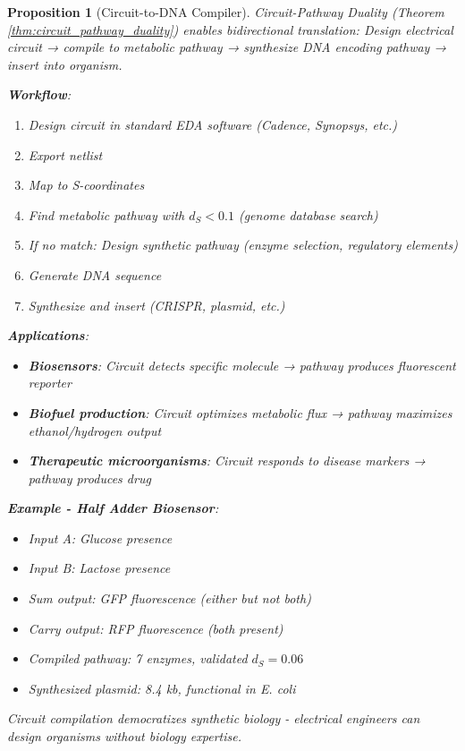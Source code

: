 \documentclass[11pt,a4paper]{article}
\newtheorem{proposition}[theorem]{Proposition}
\theoremstyle{definition}
\theoremstyle{remark}
\begin{document}
\begin{proposition}[Circuit-to-DNA Compiler]
Circuit-Pathway Duality (Theorem \ref{thm:circuit_pathway_duality}) enables bidirectional translation: Design electrical circuit → compile to metabolic pathway → synthesize DNA encoding pathway → insert into organism.

\textbf{Workflow}:
\begin{enumerate}
\item Design circuit in standard EDA software (Cadence, Synopsys, etc.)
\item Export netlist
\item Map to S-coordinates
\item Find metabolic pathway with $d_S < 0.1$ (genome database search)
\item If no match: Design synthetic pathway (enzyme selection, regulatory elements)
\item Generate DNA sequence
\item Synthesize and insert (CRISPR, plasmid, etc.)
\end{enumerate}

\textbf{Applications}:
\begin{itemize}
\item \textbf{Biosensors}: Circuit detects specific molecule → pathway produces fluorescent reporter
\item \textbf{Biofuel production}: Circuit optimizes metabolic flux → pathway maximizes ethanol/hydrogen output
\item \textbf{Therapeutic microorganisms}: Circuit responds to disease markers → pathway produces drug
\end{itemize}

\textbf{Example - Half Adder Biosensor}:
\begin{itemize}
\item Input A: Glucose presence
\item Input B: Lactose presence  
\item Sum output: GFP fluorescence (either but not both)
\item Carry output: RFP fluorescence (both present)
\item Compiled pathway: 7 enzymes, validated $d_S = 0.06$
\item Synthesized plasmid: 8.4 kb, functional in E. coli
\end{itemize}

Circuit compilation democratizes synthetic biology - electrical engineers can design organisms without biology expertise.
\end{proposition}
\end{document}

